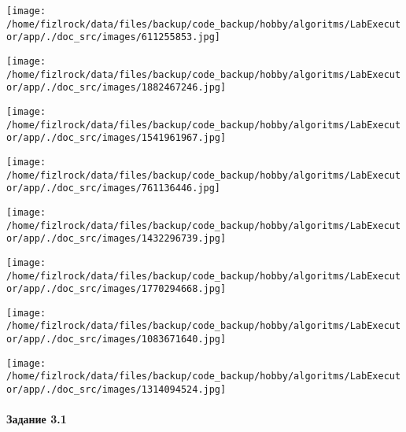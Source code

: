 \documentclass[a4paper, 12pt]{article}
\begin{document}
\texttt{[image: /home/fizlrock/data/files/backup/code\_backup/hobby/algoritms/LabExecutor/app/./doc\_src/images/611255853.jpg]}

\texttt{[image: /home/fizlrock/data/files/backup/code\_backup/hobby/algoritms/LabExecutor/app/./doc\_src/images/1882467246.jpg]}

\texttt{[image: /home/fizlrock/data/files/backup/code\_backup/hobby/algoritms/LabExecutor/app/./doc\_src/images/1541961967.jpg]}

\texttt{[image: /home/fizlrock/data/files/backup/code\_backup/hobby/algoritms/LabExecutor/app/./doc\_src/images/761136446.jpg]}

\texttt{[image: /home/fizlrock/data/files/backup/code\_backup/hobby/algoritms/LabExecutor/app/./doc\_src/images/1432296739.jpg]}

\texttt{[image: /home/fizlrock/data/files/backup/code\_backup/hobby/algoritms/LabExecutor/app/./doc\_src/images/1770294668.jpg]}

\texttt{[image: /home/fizlrock/data/files/backup/code\_backup/hobby/algoritms/LabExecutor/app/./doc\_src/images/1083671640.jpg]}

\texttt{[image: /home/fizlrock/data/files/backup/code\_backup/hobby/algoritms/LabExecutor/app/./doc\_src/images/1314094524.jpg]}
\pagebreak
\paragraph{Задание 3.1}
\end{document}
